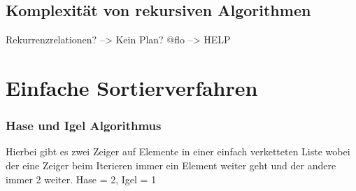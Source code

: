 \documentclass[12pt,a4paper]{article}
\begin{document}
\subsection{Komplexität von rekursiven Algorithmen}
Rekurrenzrelationen? --> Kein Plan? @flo --> HELP

\section{Einfache Sortierverfahren}
\subsubsection{Hase und Igel Algorithmus}
Hierbei gibt es zwei Zeiger auf Elemente in einer einfach verketteten Liste wobei der eine Zeiger beim Iterieren immer ein Element weiter geht und der andere immer 2 weiter. \newline
Hase = 2, Igel = 1
\newpage
\end{document}
